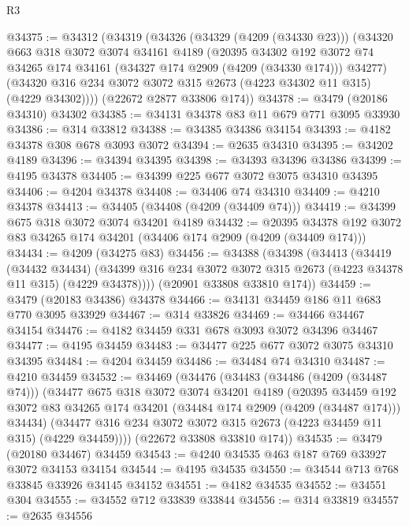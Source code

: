 \begin{lexlean}{R3}
\begin{coremodule}
@34375 := @34312
    (@34319
      (@34326
        (@34329 (@4209 (@34330 @23)))
        (@34320
          @663
          @318
          @3072
          @3074
          @34161
          @4189
          (@20395
            @34302
            @192
            @3072
            @74
            @34265
            @174
            @34161
            (@34327 @174 @2909 (@4209 (@34330 @174)))
            @34277)
          (@34320 @316 @234 @3072 @3072 @315 @2673 (@4223 @34302 @11 @315) (@4229 @34302))))
      (@22672 @2877 @33806 @174))
@34378 := @3479 (@20186 @34310) @34302
@34385 := @34131 @34378 @83 @11 @679 @771 @3095 @33930
@34386 := @314 @33812
@34388 := @34385 @34386 @34154
@34393 := @4182 @34378 @308 @678 @3093 @3072
@34394 := @2635 @34310
@34395 := @34202 @4189
@34396 := @34394 @34395
@34398 := @34393 @34396 @34386
@34399 := @4195 @34378
@34405 := @34399 @225 @677 @3072 @3075 @34310 @34395
@34406 := @4204 @34378
@34408 := @34406 @74 @34310
@34409 := @4210 @34378
@34413 := @34405 (@34408 (@4209 (@34409 @74)))
@34419 := @34399 @675 @318 @3072 @3074 @34201 @4189
@34432 := @20395 @34378 @192 @3072 @83 @34265 @174 @34201 (@34406 @174 @2909 (@4209 (@34409 @174)))
@34434 := @4209 (@34275 @83)
@34456 := @34388
    (@34398
      (@34413
        (@34419
          (@34432 @34434)
          (@34399 @316 @234 @3072 @3072 @315 @2673 (@4223 @34378 @11 @315) (@4229 @34378))))
      (@20901 @33808 @33810 @174))
@34459 := @3479 (@20183 @34386) @34378
@34466 := @34131 @34459 @186 @11 @683 @770 @3095 @33929
@34467 := @314 @33826
@34469 := @34466 @34467 @34154
@34476 := @4182 @34459 @331 @678 @3093 @3072 @34396 @34467
@34477 := @4195 @34459
@34483 := @34477 @225 @677 @3072 @3075 @34310 @34395
@34484 := @4204 @34459
@34486 := @34484 @74 @34310
@34487 := @4210 @34459
@34532 := @34469
    (@34476
      (@34483
        (@34486 (@4209 (@34487 @74)))
        (@34477
          @675
          @318
          @3072
          @3074
          @34201
          @4189
          (@20395
            @34459
            @192
            @3072
            @83
            @34265
            @174
            @34201
            (@34484 @174 @2909 (@4209 (@34487 @174)))
            @34434)
          (@34477 @316 @234 @3072 @3072 @315 @2673 (@4223 @34459 @11 @315) (@4229 @34459))))
      (@22672 @33808 @33810 @174))
@34535 := @3479 (@20180 @34467) @34459
@34543 := @4240 @34535 @463 @187 @769 @33927 @3072 @34153 @34154
@34544 := @4195 @34535
@34550 := @34544 @713 @768 @33845 @33926 @34145 @34152
@34551 := @4182 @34535
@34552 := @34551 @304
@34555 := @34552 @712 @33839 @33844
@34556 := @314 @33819
@34557 := @2635 @34556

\end{coremodule}
\end{lexlean}
